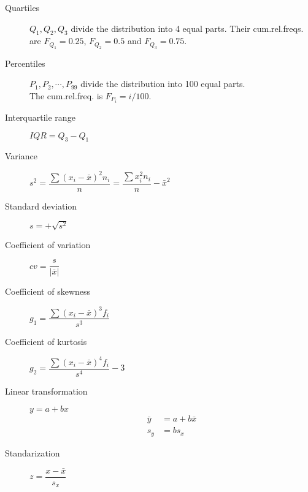 \begin{multicols*}{2}
\begin{tcolorbox}[hbox, title=Position statistics]
\begin{minipage}{0.4\textwidth}
\begin{description}
\item [Quartiles] $Q_1,Q_2,Q_3$ divide the distribution into 4 equal parts.
      Their cum.rel.freqs. are
      $F_{Q_1}=0.25$, $F_{Q_2}=0.5$ and $F_{Q_3}=0.75$.
\item [Percentiles] $P_1,P_2,\cdots,P_{99}$ divide the distribution into 100 equal parts.\\
      The cum.rel.freq. is $F_{P_i}=i/100$.
\end{description}
\end{minipage}
\end{tcolorbox}

\begin{tcolorbox}[hbox, title=Dispersion statistics]
\begin{minipage}{0.4\textwidth}
\begin{description}
\item [Interquartile range] $IQR=Q_3-Q_1$
\item [Variance] $s^2=\dfrac{\sum (x_i-\bar x)^2n_i}{n}=\dfrac{\sum x_i^2n_i}{n}-\bar x^2$
\item [Standard deviation] $s=+\sqrt{s^2}$
\item [Coefficient of variation] $cv=\dfrac{s}{|\bar{x}|}$
\end{description}
\end{minipage}
\end{tcolorbox}

\begin{tcolorbox}[hbox, title=Shape statistics]
\begin{minipage}{0.4\textwidth}
\begin{description}
\item [Coefficient of skewness] $g_1=\dfrac{\sum(x_i-\bar{x})^3f_i}{s^3}$
\item [Coefficient of kurtosis] $g_2=\dfrac{\sum(x_i-\bar{x})^4f_i}{s^4}-3$
\end{description}
\end{minipage}
\end{tcolorbox}

\begin{tcolorbox}[hbox, title=Linear transformations]
\begin{minipage}{0.4\textwidth}
\begin{description}
\item[Linear transformation] $y=a+bx$
      \begin{align*}
      \bar y & = a+b\bar x \\
      s_y    & = bs_x
      \end{align*}
\item[Standarization] $z=\dfrac{x-\bar x}{s_x}$
\end{description}
\end{minipage}
\end{tcolorbox}



\end{multicols*}
